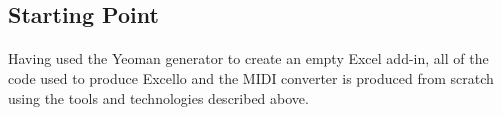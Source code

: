 %
%
\subsection{Starting Point}

\paragraph{} Having used the Yeoman generator to create an empty Excel add-in, all of the code used to produce Excello and the MIDI converter is produced from scratch using the tools and technologies described above.


